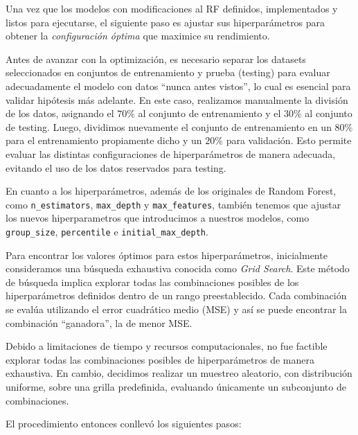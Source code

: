 Una vez que los modelos con modificaciones al RF definidos, implementados y listos para ejecutarse, el siguiente paso es ajustar sus hiperparámetros para obtener la \textit{configuración óptima} que maximice su rendimiento.

Antes de avanzar con la optimización, es necesario separar los datasets seleccionados en conjuntos de entrenamiento y prueba (testing) para evaluar adecuadamente el modelo con datos “nunca antes vistos”, lo cual es esencial para validar hipótesis más adelante. En este caso, realizamos manualmente la división de los datos, asignando el $70\%$ al conjunto de entrenamiento y el $30\%$ al conjunto de testing. Luego, dividimos nuevamente el conjunto de entrenamiento en un $80\%$ para el entrenamiento propiamente dicho y un $20\%$ para validación. Esto permite evaluar las distintas configuraciones de hiperparámetros de manera adecuada, evitando el uso de los datos reservados para testing.

En cuanto a los hiperparámetros, además de los originales de Random Forest, como \texttt{n\_estimators}, \texttt{max\_depth} y \texttt{max\_features}, también tenemos que ajustar los nuevos hiperparametros que introducimos a nuestros modelos, como \texttt{group\_size}, \texttt{percentile} e \texttt{initial\_max\_depth}. 

Para encontrar los valores óptimos para estos hiperparámetros, inicialmente consideramos una búsqueda exhaustiva conocida como \textit{Grid Search}. Este método de búsqueda implica explorar todas las combinaciones posibles de los hiperparámetros definidos dentro de un rango preestablecido. Cada combinación se evalúa utilizando el error cuadrático medio (MSE) y así se puede encontrar la combinación “ganadora”, la de menor MSE. 

Debido a limitaciones de tiempo y recursos computacionales, no fue factible explorar todas las combinaciones posibles de hiperparámetros de manera exhaustiva. En cambio, decidimos realizar un muestreo aleatorio, con distribución uniforme, sobre una grilla predefinida, evaluando únicamente un subconjunto de combinaciones.

El procedimiento entonces conllevó los siguientes pasos: 

